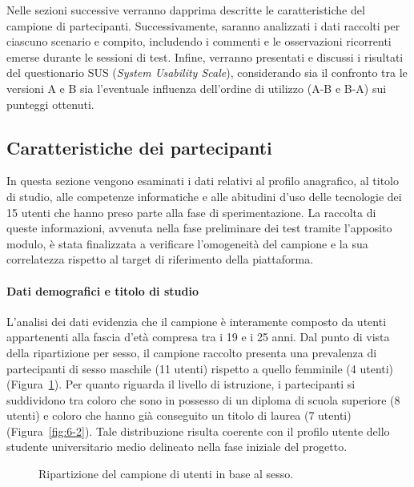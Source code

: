 Nelle sezioni successive verranno dapprima descritte le caratteristiche del campione di partecipanti. Successivamente, saranno analizzati i dati raccolti per ciascuno scenario e compito, includendo i commenti e le osservazioni ricorrenti emerse durante le sessioni di test. Infine, verranno presentati e discussi i risultati del questionario SUS (\textit{System Usability Scale}), considerando sia il confronto tra le versioni A e B sia l'eventuale influenza dell'ordine di utilizzo (A-B e B-A) sui punteggi ottenuti.


\subsection{Caratteristiche dei partecipanti}
\label{subsec:caratteristiche_partecipanti}
In questa sezione vengono esaminati i dati relativi al profilo anagrafico, al titolo di studio, alle competenze informatiche e alle abitudini d'uso delle tecnologie dei 15 utenti che hanno preso parte alla fase di sperimentazione. La raccolta di queste informazioni, avvenuta nella fase preliminare dei test tramite l'apposito modulo, è stata finalizzata a verificare l'omogeneità del campione e la sua correlatezza rispetto al target di riferimento della piattaforma.

\paragraph{Dati demografici e titolo di studio}
L'analisi dei dati evidenzia che il campione è interamente composto da utenti appartenenti alla fascia d'età compresa tra i 19 e i 25 anni. Dal punto di vista della ripartizione per sesso, il campione raccolto presenta una prevalenza di partecipanti di sesso maschile (11 utenti) rispetto a quello femminile (4 utenti) (Figura~\ref{fig:6-1}). Per quanto riguarda il livello di istruzione, i partecipanti si suddividono tra coloro che sono in possesso di un diploma di scuola superiore (8 utenti) e coloro che hanno già conseguito un titolo di laurea (7 utenti) (Figura~\ref{fig:6-2}). Tale distribuzione risulta coerente con il profilo utente dello studente universitario medio delineato nella fase iniziale del progetto.

\begin{figure}[H]
	\centering
	\caption{Ripartizione del campione di utenti in base al sesso.}
	\label{fig:6-1}
\end{figure}

